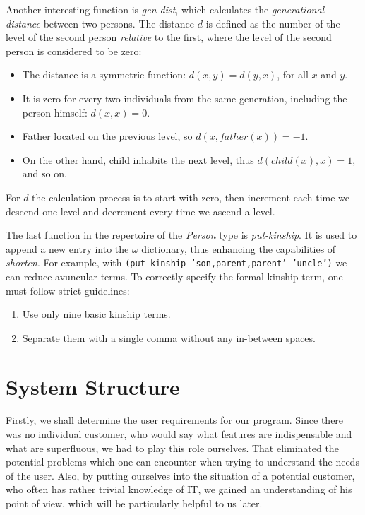     Another interesting function is \textit{gen-dist}, which calculates the \textit{generational distance} between two persons.
    The distance $d$ is defined as the number of the level of the second person \textit{relative} to the first, where the level of the
    second person is considered to be zero:
    \begin{itemize}
        \item{The distance is a symmetric function: $d(x, y) = d(y, x)$, for all $x$ and $y$.}
        \item{It is zero for every two individuals from the same generation, including the person himself: $d(x, x) = 0$.}
        \item{Father located on the previous level, so $d(x, father(x)) = -1$.}
        \item{On the other hand, child inhabits the next level, thus $d(child(x), x) = 1$, and so on.}
    \end{itemize}
    For $d$ the calculation process is to start with zero, then increment each time we descend one level and decrement every time we
    ascend a level.

    The last function in the repertoire of the \textit{Person} type is \textit{put-kinship}. It is used to append a new entry
    into the $\omega$ dictionary, thus enhancing the capabilities of \textit{shorten}. For example, with \texttt{(put-kinship
    'son,parent,parent' 'uncle')} we can reduce avuncular terms. To correctly specify the formal kinship term, one must follow strict
    guidelines:
    \begin{enumerate}
        \item{Use only nine basic kinship terms.}
        \item{Separate them with a single comma without any in-between spaces.}
    \end{enumerate}

\section{System Structure}
    Firstly, we shall determine the user requirements for our program. Since there was no individual customer, who would say what
    features are indispensable and what are superfluous, we had to play this role ourselves. That eliminated the potential problems
    which one can encounter when trying to understand the needs of the user. Also, by putting ourselves into the situation of a
    potential customer, who often has rather trivial knowledge of IT, we gained an understanding of his point of view, which will be
    particularly helpful to us later.

